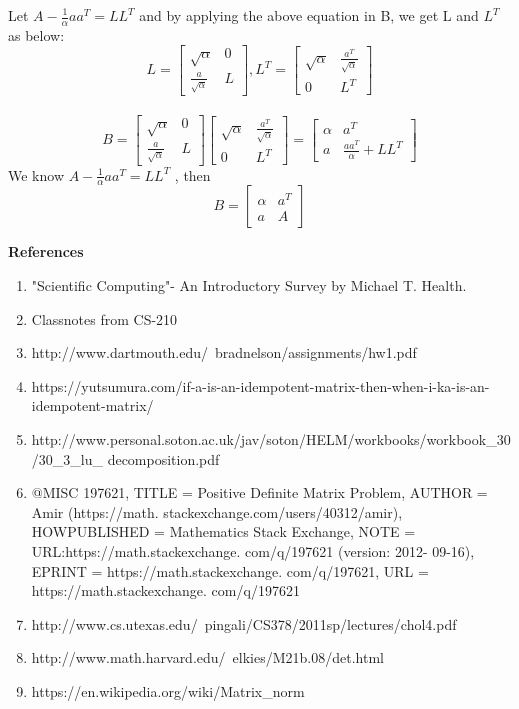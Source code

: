\documentclass[12pt, oneside]{article}   	%
\begin{document}
\begin{enumerate}
\begin{enumerate}
	Let $A - \frac{1}{\alpha} a a^T= LL^T$ and by applying the above equation in B, we get L and $L^{T}$ as below:\\
	
	$$
	L= \left [\begin{array}{cc} \sqrt{\alpha}& 0\\\frac{a}{\sqrt{\alpha}}&  L \end{array}\right ] , L^T=
	\left[\begin{array}{cc}\sqrt{\alpha}& \frac{a^T}{\sqrt{\alpha}}\\ 0& L^{T} \end{array}\right]
	$$ \\
	$$
	B= \left [\begin{array}{cc} \sqrt{\alpha}& 0\\\frac{a}{\sqrt{\alpha}}&  L \end{array}\right ]\left[\begin{array}{cc}\sqrt{\alpha}& \frac{a^T}{\sqrt{\alpha}}\\ 0& L^{T} \end{array}\right]=
		\left[\begin{array}{cc}\alpha& a^T\\ a& \frac{aa^{T}}{\alpha}+LL^{T} \end{array}\right]
	$$
	We know $A - \frac{1}{\alpha} a a^T= LL^T$ , then 
	$$
	B=\left[\begin{array}{cc}\alpha& a^T\\ a& A \end{array}\right]
	$$
	
\end{enumerate}
\end{enumerate}


\vspace{1cm}
\textbf{ \Large References}\\
\begin{enumerate}
	\item "Scientific Computing"- An Introductory Survey by Michael T. Health.
	\item Classnotes from CS-210
	\item http://www.dartmouth.edu/~bradnelson/assignments/hw1.pdf
	\item https://yutsumura.com/if-a-is-an-idempotent-matrix-then-when-i-ka-is-an-idempotent-matrix/
	\item http://www.personal.soton.ac.uk/jav/soton/HELM/workbooks/workbook\_30/30\_3\_lu\_
	decomposition.pdf
	\item @MISC {197621,
		TITLE = {Positive Definite Matrix Problem},
		AUTHOR = {Amir (https://math.
			stackexchange.com/users/40312/amir)},
		HOWPUBLISHED = {Mathematics Stack 
			Exchange},
		NOTE = {URL:https://math.stackexchange.
			com/q/197621 (version: 2012-
			09-16)},
		EPRINT = {https://math.stackexchange.
			com/q/197621},
		URL = {https://math.stackexchange.
			com/q/197621}
			}
		\item http://www.cs.utexas.edu/~pingali/CS378/2011sp/lectures/chol4.pdf
		\item http://www.math.harvard.edu/~elkies/M21b.08/det.html
		\item https://en.wikipedia.org/wiki/Matrix\_norm
\end{enumerate}
\end{document}
